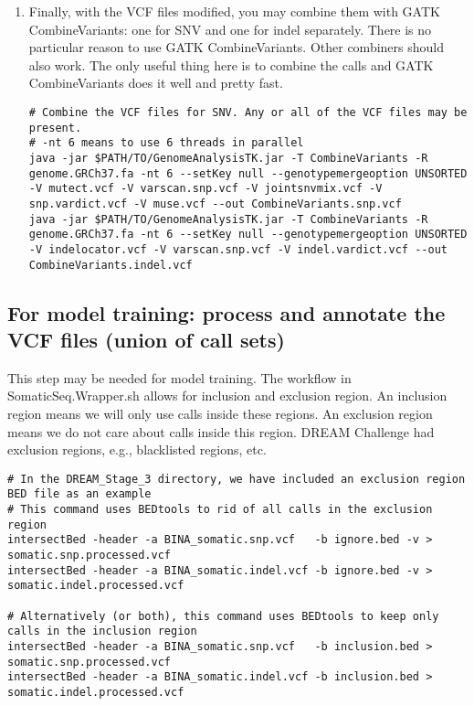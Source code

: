 \documentclass[10pt,letterpaper]{article}
\begin{document}
\begin{sloppypar}
\begin{enumerate}
\item
Finally, with the VCF files modified, you may combine them with GATK CombineVariants: one for SNV and one for indel separately. There is no particular reason to use GATK CombineVariants. Other combiners should also work. The only useful thing here is to combine the calls and GATK CombineVariants does it well and pretty fast. 
	
\begin{lstlisting}
# Combine the VCF files for SNV. Any or all of the VCF files may be present.
# -nt 6 means to use 6 threads in parallel
java -jar $PATH/TO/GenomeAnalysisTK.jar -T CombineVariants -R genome.GRCh37.fa -nt 6 --setKey null --genotypemergeoption UNSORTED -V mutect.vcf -V varscan.snp.vcf -V jointsnvmix.vcf -V snp.vardict.vcf -V muse.vcf --out CombineVariants.snp.vcf
java -jar $PATH/TO/GenomeAnalysisTK.jar -T CombineVariants -R genome.GRCh37.fa -nt 6 --setKey null --genotypemergeoption UNSORTED -V indelocator.vcf -V varscan.snp.vcf -V indel.vardict.vcf --out CombineVariants.indel.vcf
\end{lstlisting}


\end{enumerate}





\subsection{For model training: process and annotate the VCF files (union of call sets)}

This step may be needed for model training. The workflow in SomaticSeq.Wrapper.sh allows for inclusion and exclusion region. An inclusion region means we will only use calls inside these regions. An exclusion region means we do not care about calls inside this region. DREAM Challenge had exclusion regions, e.g., blacklisted regions, etc. 
	
\begin{lstlisting}
# In the DREAM_Stage_3 directory, we have included an exclusion region BED file as an example
# This command uses BEDtools to rid of all calls in the exclusion region
intersectBed -header -a BINA_somatic.snp.vcf   -b ignore.bed -v > somatic.snp.processed.vcf
intersectBed -header -a BINA_somatic.indel.vcf -b ignore.bed -v > somatic.indel.processed.vcf

# Alternatively (or both), this command uses BEDtools to keep only calls in the inclusion region
intersectBed -header -a BINA_somatic.snp.vcf   -b inclusion.bed > somatic.snp.processed.vcf
intersectBed -header -a BINA_somatic.indel.vcf -b inclusion.bed > somatic.indel.processed.vcf


\end{lstlisting}
\end{sloppypar}
\end{document}

